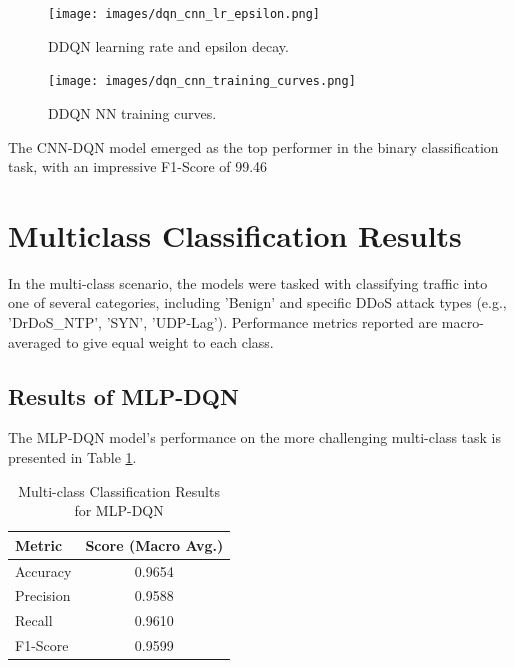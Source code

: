 \documentclass[16pt]{report}
\begin{document}
\vspace{0.5cm}

\begin{figure}[htbp]
    \centering
    \texttt{[image: images/dqn\_cnn\_lr\_epsilon.png]}
    \caption{DDQN learning rate and epsilon decay.}
    \label{fig:ddqn_lr_epsilon}
\end{figure}

\vspace{0.5cm}

\begin{figure}[htbp]
    \centering
    \texttt{[image: images/dqn\_cnn\_training\_curves.png]}
    \caption{DDQN NN training curves.}
    \label{fig:ddqn_training_curves}
\end{figure}

The CNN-DQN model emerged as the top performer in the binary classification task, with an impressive F1-Score of 99.46%

\newpage


\section{Multiclass Classification Results}
In the multi-class scenario, the models were tasked with classifying traffic into one of several categories, including 'Benign' and specific DDoS attack types (e.g., 'DrDoS\_NTP', 'SYN', 'UDP-Lag'). Performance metrics reported are macro-averaged to give equal weight to each class.

\subsection{Results of MLP-DQN}
The MLP-DQN model's performance on the more challenging multi-class task is presented in Table \ref{tab:multi_dqn_results}.

\begin{table}[H]
    \centering
    \caption{Multi-class Classification Results for MLP-DQN}
    \label{tab:multi_dqn_results}
    \begin{tabular}{@{}lc@{}}
        \toprule
        \textbf{Metric} & \textbf{Score (Macro Avg.)} \\
        \midrule
        Accuracy & 0.9654 \\
        Precision & 0.9588 \\
        Recall & 0.9610 \\
        F1-Score & 0.9599 \\
        \bottomrule
    \end{tabular}
\end{table}
\end{document}
